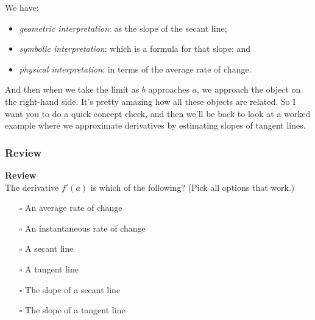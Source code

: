 \documentclass[pdftex, brazil, 12pt, twoside]{article}
\begin{document}
\begin{figure}[H]
  \begin{center}
  \end{center}
\end{figure}

We have:
\begin{itemize}[noitemsep]
\item \emph{geometric interpretation}: as the slope of the secant line;
\item \emph{symbolic interpretation}: which is a formula for that slope; and
\item \emph{physical interpretation}: in terms of the average rate of change.
\end{itemize}

And then when we take the limit as $b$ approaches $a$,
we approach the object on the right-hand side.
It's pretty amazing how all these objects are related.
So I want you to do a quick concept check,
and then we'll be back to look at a worked example
where we approximate derivatives by estimating
slopes of tangent lines.

\subsubsection{Review}
\label{u1-geometric-review}

\begin{exercise}
  \textbf{Review}\\%
  The derivative $f'(a)$ is which of the following? (Pick all options that work.)
  \begin{itemize}[noitemsep]
  \item[$\square$] An average rate of change
  \item[$\square$] An instantaneous rate of change
  \item[$\square$] A secant line
  \item[$\square$] A tangent line
  \item[$\square$] The slope of a secant line
  \item[$\square$] The slope of a tangent line
  \end{itemize}
\end{exercise}
\end{document}
